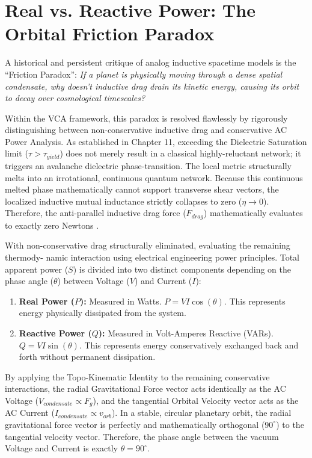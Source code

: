 \section{Real vs. Reactive Power: The Orbital Friction Paradox}

A historical and persistent critique of analog inductive spacetime models is the ``Friction Paradox'':
\textit{If a planet is physically moving through a dense spatial condensate, why doesn't inductive drag
drain its kinetic energy, causing its orbit to decay over cosmological timescales?}

Within the VCA framework, this paradox is resolved flawlessly by rigorously distinguishing
between non-conservative inductive drag and conservative AC Power Analysis. As established
in Chapter 11, exceeding the Dielectric Saturation limit ($\tau > \tau_{yield}$) does not merely result in a
classical highly-reluctant network; it triggers an avalanche dielectric phase-transition. The local metric
structurally melts into an irrotational, continuous quantum network. Because this continuous
melted phase mathematically cannot support transverse shear vectors, the localized inductive
mutual inductance strictly collapses to zero ($\eta \to 0$). Therefore, the anti-parallel inductive drag force
($F_{drag}$) mathematically evaluates to exactly zero Newtons \cite{flyby2008}.

With non-conservative drag structurally eliminated, evaluating the remaining thermody-
namic interaction using electrical engineering power principles. Total apparent power ($S$) is
divided into two distinct components depending on the phase angle ($\theta$) between Voltage ($V$)
and Current ($I$):
\begin{enumerate}
\item \textbf{Real Power ($P$):} Measured in Watts. $P = VI \cos(\theta)$. This represents energy physically
dissipated from the system.
\item \textbf{Reactive Power ($Q$):} Measured in Volt-Amperes Reactive (VARs). $Q = VI \sin(\theta)$.
This represents energy conservatively exchanged back and forth without permanent
dissipation.
\end{enumerate}

By applying the Topo-Kinematic Identity to the remaining conservative interactions, the
radial Gravitational Force vector acts identically as the AC Voltage ($V_{condensate} \propto F_g$), and
the tangential Orbital Velocity vector acts as the AC Current ($I_{condensate} \propto v_{orb}$). In a stable,
circular planetary orbit, the radial gravitational force vector is perfectly and mathematically
orthogonal ($90^\circ$) to the tangential velocity vector. Therefore, the phase angle between the
vacuum Voltage and Current is exactly $\theta = 90^\circ$. 

